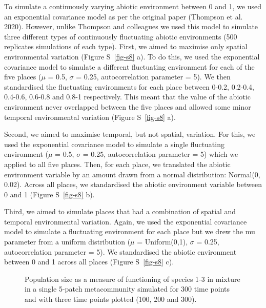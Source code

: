 \documentclass[
  letterpaper,
  DIV=11,
  numbers=noendperiod]{scrartcl}
\begin{document}
To simulate a continuously varying abiotic environment between 0 and 1,
we used an exponential covariance model as per the original paper
(Thompson et al. 2020). However, unlike Thompson and colleagues we used
this model to simulate three different types of continuously fluctuating
abiotic environments (500 replicates simulations of each type). First,
we aimed to maximise only spatial environmental variation (Figure
S~\ref{fig-s8} a). To do this, we used the exponential covariance model
to simulate a different fluctuating environment for each of the five
places (\(\mu\) = 0.5, \(\sigma\) = 0.25, autocorrelation parameter =
5). We then standardised the fluctuating environments for each place
between 0-0.2, 0.2-0.4, 0.4-0.6, 0.6-0.8 and 0.8-1 respectively. This
meant that the value of the abiotic environment never overlapped between
the five places and allowed some minor temporal environmental variation
(Figure S~\ref{fig-s8} a).

Second, we aimed to maximise temporal, but not spatial, variation. For
this, we used the exponential covariance model to simulate a single
fluctuating environment (\(\mu\) = 0.5, \(\sigma\) = 0.25,
autocorrelation parameter = 5) which we applied to all five places.
Then, for each place, we translated the abiotic environment variable by
an amount drawn from a normal distribution: Normal(0, 0.02). Across all
places, we standardised the abiotic environment variable between 0 and 1
(Figure S~\ref{fig-s8} b).

Third, we aimed to simulate places that had a combination of spatial and
temporal environmental variation. Again, we used the exponential
covariance model to simulate a fluctuating environment for each place
but we drew the mu parameter from a uniform distribution (\(\mu\) =
Uniform(0,1), \(\sigma\) = 0.25, autocorrelation parameter = 5). We
standardised the abiotic environment between 0 and 1 across all places
(Figure S~\ref{fig-s8} c).

\begin{figure}


\caption{\label{fig-s9}Population size as a measure of functioning of
species 1-3 in mixture in a single 5-patch metacommunity simulated for
300 time points and with three time points plotted (100, 200 and 300).}

\end{figure}%
\end{document}
